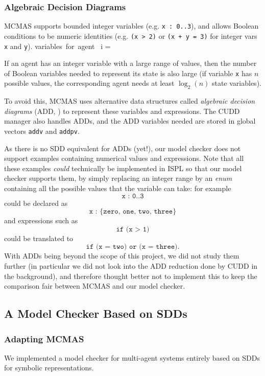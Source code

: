 \documentclass[11pt]{article}
\begin{document}
\subsubsection{Algebraic Decision Diagrams}

MCMAS supports bounded integer variables (e.g. \texttt{x : 0..3}), and allows Boolean conditions to be numeric identities (e.g. \texttt{(x > 2)} or \texttt{(x + y = 3)} for integer vars \texttt{x} and \texttt{y}). \mbox{variables for agent } i = 

If an agent has an integer variable with a large range of values, then the number of Boolean variables needed to represent its state is also large (if variable \texttt{x} has $n$ possible values, the corresponding agent needs at least $\log_2(n)$ state variables). 

To avoid this, MCMAS uses alternative data structures called \textit{algebraic decision diagrams} (ADD, \cite{add}) to represent these variables and expressions. The CUDD manager also handles ADDs, and the ADD variables needed are stored in global vectors \texttt{addv} and \texttt{addpv}.

As there is no SDD equivalent for ADDs (yet!), our model checker does not support examples containing numerical values and expressions.
Note that all these examples \textit{could} technically be implemented in ISPL so that our model checker supports them, by simply replacing an integer range by an \textit{enum} containing all the possible values that the variable can take: for example 
$$\texttt{x : 0..3} $$
could be declared as $$\texttt{x : \{zero, one, two, three\}}$$
and expressions such as $$\texttt{if (x > 1)}$$ could be translated to $$\texttt{if (x = two) or (x = three)}.$$
With ADDs being beyond the scope of this project, we did not study them further (in particular we did not look into the ADD reduction done by CUDD in the background), and therefore thought better not to implement this to keep the comparison fair between MCMAS and our model checker. 

\subsection{A Model Checker Based on SDDs}

\subsubsection{Adapting MCMAS}

We implemented a model checker for multi-agent systems entirely based on SDDs for symbolic representations. 
\end{document}
